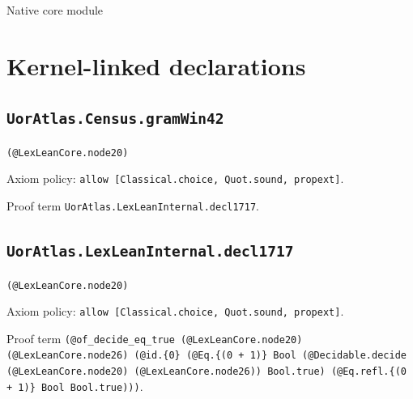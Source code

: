 \documentclass[11pt]{article}
\begin{document}
\begin{center}{\LARGE Native core module}\end{center}
\section*{Kernel-linked declarations}
\subsection*{\texttt{UorAtlas.Census.gramWin42}}
\noindent\texttt{(@LexLeanCore.node20)}\par
\noindent Axiom policy: \texttt{allow [Classical.choice, Quot.sound, propext]}.\par
\noindent Proof term \texttt{UorAtlas.LexLeanInternal.decl1717}.\par
\subsection*{\texttt{UorAtlas.LexLeanInternal.decl1717}}
\noindent\texttt{(@LexLeanCore.node20)}\par
\noindent Axiom policy: \texttt{allow [Classical.choice, Quot.sound, propext]}.\par
\noindent Proof term \texttt{(@of\_decide\_eq\_true (@LexLeanCore.node20) (@LexLeanCore.node26) (@id.\{0\} (@Eq.\{(0 + 1)\} Bool (@Decidable.decide (@LexLeanCore.node20) (@LexLeanCore.node26)) Bool.true) (@Eq.refl.\{(0 + 1)\} Bool Bool.true)))}.\par
\end{document}
